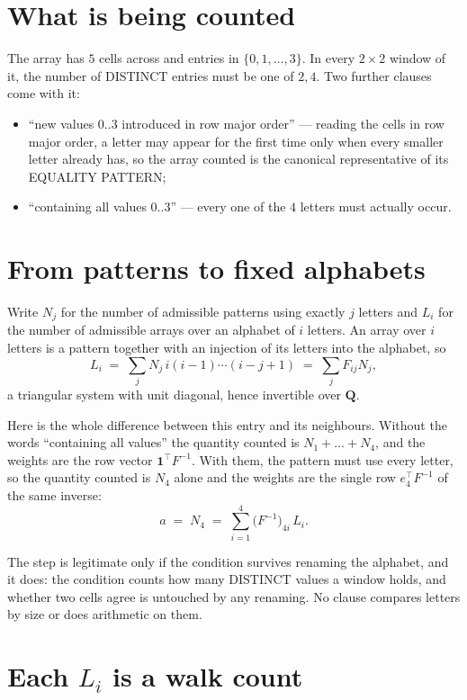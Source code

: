 \documentclass[11pt,a4paper]{article}
\theoremstyle{plain}
\theoremstyle{definition}
\begin{document}
\section{What is being counted}

The array has $5$ cells across and entries in $\{0,1,\dots,3\}$. In every
$2\times2$ window of it, the number of DISTINCT entries must be one of $2, 4$. Two
further clauses come with it:

\begin{itemize}
\item ``new values $0..3$ introduced in row major order'' --- reading the cells in row major
order, a letter may appear for the first time only when every smaller letter already has, so
the array counted is the canonical representative of its EQUALITY PATTERN;
\item ``containing all values $0..3$'' --- every one of the $4$ letters must actually
occur.
\end{itemize}


\section{From patterns to fixed alphabets}

Write $N_j$ for the number of admissible patterns using exactly $j$ letters and $L_i$ for the
number of admissible arrays over an alphabet of $i$ letters. An array over $i$ letters is a
pattern together with an injection of its letters into the alphabet, so
\[
L_i\;=\;\sum_{j} N_j\,i(i-1)\cdots(i-j+1)\;=\;\sum_j F_{ij}N_j ,
\]
a triangular system with unit diagonal, hence invertible over $\mathbf{Q}$.

Here is the whole difference between this entry and its neighbours. Without the words
``containing all values'' the quantity counted is $N_1+\dots+N_{4}$, and the weights are
the row vector $\mathbf{1}^{\!\top}F^{-1}$. With them, the pattern must use every letter,
so the quantity counted is $N_{4}$ alone and the weights are the single row
$e_{4}^{\!\top}F^{-1}$ of the same inverse:
\[
a\;=\;N_{4}\;=\;\sum_{i=1}^{4}\bigl(F^{-1}\bigr)_{4i}\,L_i .
\]

The step is legitimate only if the condition survives renaming the alphabet, and it does: the
condition counts how many DISTINCT values a window holds, and whether two cells agree is
untouched by any renaming. No clause compares letters by size or does arithmetic on them.

\section{Each $L_i$ is a walk count}
\end{document}
